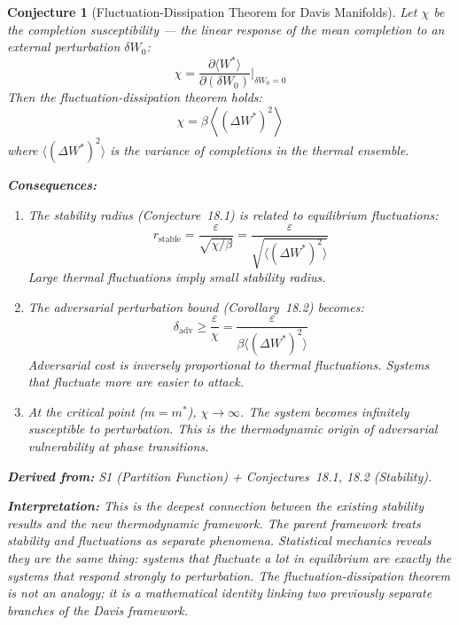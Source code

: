 \documentclass[11pt,letterpaper]{article}
\newtheorem{conjecture}{Conjecture}[section]
\begin{document}
\begin{conjecture}[Fluctuation-Dissipation Theorem for Davis 
Manifolds]\label{conj:fdt}
Let $\chi$ be the \emph{completion susceptibility} --- the linear response 
of the mean completion to an external perturbation $\delta W_0$:
\begin{equation}\label{eq:susceptibility}
    \chi = \frac{\partial \langle W^* \rangle}{\partial (\delta W_0)}
    \bigg|_{\delta W_0 = 0}
\end{equation}
Then the fluctuation-dissipation theorem holds:
\begin{equation}\label{eq:fdt}
    \chi = \beta \left\langle (\Delta W^*)^2 \right\rangle
\end{equation}
where $\langle (\Delta W^*)^2 \rangle$ is the variance of completions in 
the thermal ensemble.

\textbf{Consequences:}
\begin{enumerate}[label=(\alph*)]
    \item The stability radius (Conjecture~18.1) is related to equilibrium 
    fluctuations:
    \begin{equation}\label{eq:stability_fdt}
        r_{\mathrm{stable}} = \frac{\varepsilon}{\sqrt{\chi / \beta}} 
        = \frac{\varepsilon}{\sqrt{\langle (\Delta W^*)^2 \rangle}}
    \end{equation}
    Large thermal fluctuations imply small stability radius.
    
    \item The adversarial perturbation bound (Corollary~18.2) becomes:
    \begin{equation}\label{eq:adversarial_fdt}
        \delta_{\mathrm{adv}} \geq \frac{\varepsilon}{\chi} 
        = \frac{\varepsilon}{\beta \langle (\Delta W^*)^2 \rangle}
    \end{equation}
    Adversarial cost is inversely proportional to thermal fluctuations. 
    Systems that fluctuate more are easier to attack.
    
    \item At the critical point ($m = m^*$), $\chi \to \infty$. The system 
    becomes infinitely susceptible to perturbation. This is the 
    \emph{thermodynamic origin of adversarial vulnerability at phase 
    transitions}.
\end{enumerate}

\textbf{Derived from:} S1 (Partition Function) + Conjectures~18.1, 18.2 
(Stability).

\textbf{Interpretation:} This is the deepest connection between the 
existing stability results and the new thermodynamic framework. The parent 
framework treats stability and fluctuations as separate phenomena. 
Statistical mechanics reveals they are the same thing: systems that 
fluctuate a lot in equilibrium are exactly the systems that respond strongly 
to perturbation. The fluctuation-dissipation theorem is not an analogy; it 
is a mathematical identity linking two previously separate branches of the 
Davis framework.
\end{conjecture}
\end{document}
